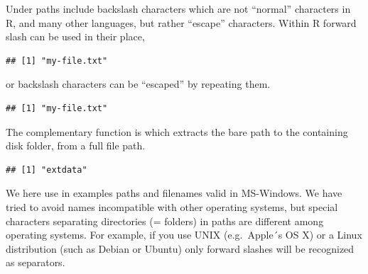 \documentclass[krantz2]{krantz}\usepackage{knitr}%
\begin{document}
Under  paths include backslash characters which are not ``normal'' characters in R, and many other languages, but rather ``escape'' characters. Within R forward slash can be used in their place,

\begin{knitrout}\footnotesize
{}\color{fgcolor}\begin{kframe}
\begin{alltt}
\hlstd{(}\hlstd{)}
\end{alltt}
\begin{verbatim}
## [1] "my-file.txt"
\end{verbatim}
\end{kframe}
\end{knitrout}

or backslash characters can be ``escaped'' by repeating them.
\begin{knitrout}\footnotesize
{}\color{fgcolor}\begin{kframe}
\begin{alltt}
\hlstd{(}\hlstd{)}
\end{alltt}
\begin{verbatim}
## [1] "my-file.txt"
\end{verbatim}
\end{kframe}
\end{knitrout}

The complementary function is  which extracts the bare path to the containing disk folder, from a full file path.
\begin{knitrout}\footnotesize
{}\color{fgcolor}\begin{kframe}
\begin{alltt}
\hlstd{(}\hlstd{)}
\end{alltt}
\begin{verbatim}
## [1] "extdata"
\end{verbatim}
\end{kframe}
\end{knitrout}

\begin{warningbox}
We here use in examples paths and filenames valid in MS-Windows. We have tried to avoid names incompatible with other operating systems, but special characters separating directories (= folders) in paths are different among operating systems. For example, if you use UNIX (e.g.\ Apple´s OS X) or a Linux distribution (such as Debian or Ubuntu) only forward slashes will be recognized as separators.
\end{warningbox}
\end{document}
